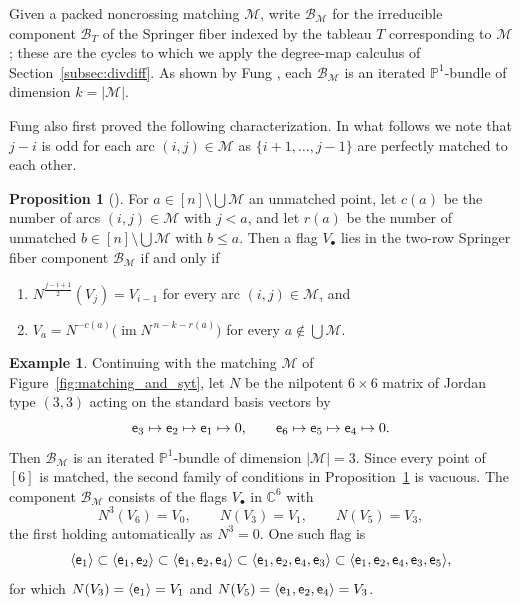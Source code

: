 \documentclass[11pt]{amsart}
\theoremstyle{definition}
\newtheorem{prop}[thm]{Proposition}
\newtheorem{eg}[thm]{Example}
\numberwithin{equation}{section}
\begin{document}
Given a packed noncrossing matching $\mathcal{M}$, write $\mathcal{B}_\mathcal{M}$ for the irreducible component $\mathcal{B}_T$ of the Springer fiber indexed by the tableau $T$ corresponding to $\mathcal{M}$; these are the cycles to which we apply the degree-map calculus of Section~\ref{subsec:divdiff}.
As shown by Fung \cite[Proposition 5.1]{Fun03}, each $\mathcal{B}_\mathcal{M}$ is an iterated $\mathbb{P}^1$-bundle of dimension $k=|\mathcal{M}|$.

Fung \cite{Fun03} also first proved the following characterization. In what follows we note that $j-i$ is odd for each arc $(i,j)\in \mathcal{M}$ as $\{i+1,\ldots,j-1\}$ are perfectly matched to each other.


\begin{prop}[{\cite[Proposition 7]{SW12}}]
For $a\in[n]\setminus \bigcup \mathcal{M}$ an unmatched point, let $c(a)$ be the number of arcs $(i,j)\in\mathcal{M}$ with $j<a$, and let $r(a)$ be the number of unmatched $b\in [n]\setminus \bigcup \mathcal{M}$ with $b\le a$.
Then a flag $V_\bullet$ lies in the two-row Springer fiber component $\mathcal{B}_\mathcal{M}$ if and only if
\begin{enumerate}
    \item $N^{\frac{j-i+1}{2}}(V_j)=V_{i-1}$ for every arc $(i,j)\in\mathcal{M}$, and
    \item $V_a=N^{-c(a)}\bigl(\operatorname{im} N^{\,n-k-r(a)}\bigr)$ for every $a\notin\bigcup\mathcal{M}$.
\end{enumerate}
\label{prop:fung_characterization}
\end{prop}


\begin{eg}\label{eg:springer}
Continuing with the matching $\mathcal{M}$ of
Figure~\ref{fig:matching_and_syt}, let $N$ be the nilpotent $6\times 6$ matrix of Jordan type $(3,3)$ acting on the standard basis vectors by
\[
{\sf e}_3\mapsto {\sf e}_2\mapsto {\sf e}_1\mapsto 0,\qquad {\sf e}_6\mapsto {\sf e}_5\mapsto {\sf e}_4\mapsto 0.
\]
Then $\mathcal{B}_\mathcal{M}$ is an iterated $\mathbb{P}^1$-bundle of dimension $|\mathcal{M}|=3$. Since every point of $[6]$ is matched, the second family of conditions in
Proposition~\ref{prop:fung_characterization} is vacuous.
The component
$\mathcal{B}_{\mathcal{M}}$ consists of the flags $V_\bullet$ in $\mathbb{C}^6$ with
\[
N^{3}(V_6)=V_0,\qquad N(V_3)=V_1,\qquad N(V_5)=V_3,
\]
the first holding automatically as $N^3=0$. One such flag is
\[
\langle {\sf e}_1\rangle\subset
\langle {\sf e}_1,{\sf e}_2\rangle\subset
\langle {\sf e}_1,{\sf e}_2,{\sf e}_4\rangle\subset
\langle {\sf e}_1,{\sf e}_2,{\sf e}_4,{\sf e}_3\rangle\subset
\langle {\sf e}_1,{\sf e}_2,{\sf e}_4,{\sf e}_3,{\sf e}_5\rangle,
\]
for which $N(V_3)=\langle {\sf e}_1\rangle=V_1$ and
$N(V_5)=\langle {\sf e}_1,{\sf e}_2,{\sf e}_4\rangle=V_3$.
\end{eg}
\end{document}
